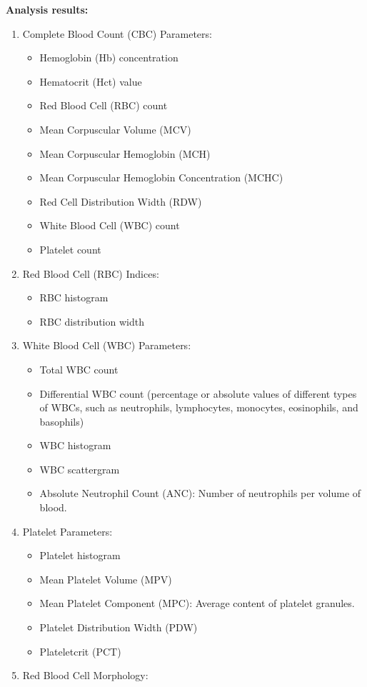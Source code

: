 \documentclass[
  11pt,
  letterpaper,
  DIV=11,
  numbers=noendperiod]{scrreprt}
\providecommand{\tightlist}{%
  \setlength{\itemsep}{0pt}\setlength{\parskip}{0pt}}\usepackage{longtable,booktabs,array}
\begin{document}
\textbf{Analysis results:}

\begin{enumerate}
\def\labelenumi{\arabic{enumi}.}
\tightlist
\item
  Complete Blood Count (CBC) Parameters:

  \begin{itemize}
  \tightlist
  \item
    Hemoglobin (Hb) concentration
  \item
    Hematocrit (Hct) value
  \item
    Red Blood Cell (RBC) count
  \item
    Mean Corpuscular Volume (MCV)
  \item
    Mean Corpuscular Hemoglobin (MCH)
  \item
    Mean Corpuscular Hemoglobin Concentration (MCHC)
  \item
    Red Cell Distribution Width (RDW)
  \item
    White Blood Cell (WBC) count
  \item
    Platelet count
  \end{itemize}
\item
  Red Blood Cell (RBC) Indices:

  \begin{itemize}
  \tightlist
  \item
    RBC histogram
  \item
    RBC distribution width
  \end{itemize}
\item
  White Blood Cell (WBC) Parameters:

  \begin{itemize}
  \tightlist
  \item
    Total WBC count
  \item
    Differential WBC count (percentage or absolute values of different
    types of WBCs, such as neutrophils, lymphocytes, monocytes,
    eosinophils, and basophils)
  \item
    WBC histogram
  \item
    WBC scattergram
  \item
    Absolute Neutrophil Count (ANC): Number of neutrophils per volume of
    blood.
  \end{itemize}
\item
  Platelet Parameters:

  \begin{itemize}
  \tightlist
  \item
    Platelet histogram
  \item
    Mean Platelet Volume (MPV)
  \item
    Mean Platelet Component (MPC): Average content of platelet granules.
  \item
    Platelet Distribution Width (PDW)
  \item
    Plateletcrit (PCT)
  \end{itemize}
\item
  Red Blood Cell Morphology:


\end{enumerate}
\end{document}
